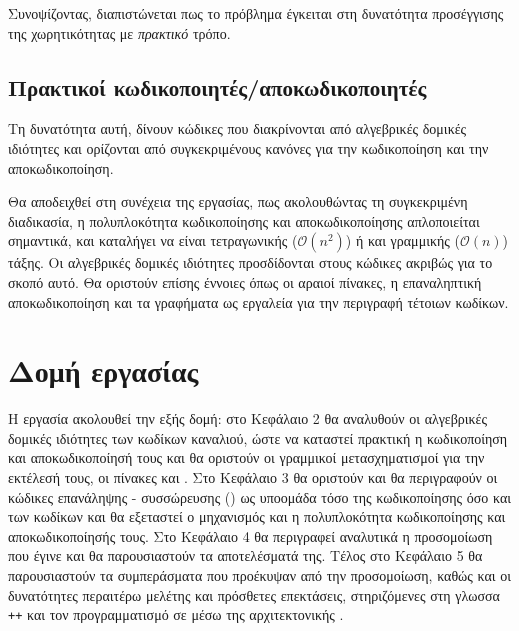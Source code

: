 Συνοψίζοντας, διαπιστώνεται πως το πρόβλημα έγκειται στη δυνατότητα προσέγγισης της χωρητικότητας με \textit{πρακτικό} τρόπο.

\subsection{Πρακτικοί κωδικοποιητές/αποκωδικοποιητές}
Τη δυνατότητα αυτή, δίνουν κώδικες που διακρίνονται από αλγεβρικές δομικές ιδιότητες και ορίζονται από συγκεκριμένους κανόνες για την κωδικοποίηση και την αποκωδικοποίηση.

Θα αποδειχθεί στη συνέχεια της εργασίας, πως ακολουθώντας τη συγκεκριμένη διαδικασία, η πολυπλοκότητα κωδικοποίησης και αποκωδικοποίησης απλοποιείται σημαντικά, και καταλήγει να είναι τετραγωνικής ($\mathcal{O}(n^2)$) ή και γραμμικής ($\mathcal{O}(n)$) τάξης. Οι αλγεβρικές δομικές ιδιότητες προσδίδονται στους κώδικες ακριβώς για το σκοπό αυτό. Θα οριστούν επίσης έννοιες όπως οι αραιοί πίνακες, η επαναληπτική αποκωδικοποίηση και τα γραφήματα  ως εργαλεία για την περιγραφή τέτοιων κωδίκων.

\section{Δομή εργασίας}
Η εργασία ακολουθεί την εξής δομή: στο Κεφάλαιο 2 θα αναλυθούν οι αλγεβρικές δομικές ιδιότητες των κωδίκων καναλιού, ώστε να καταστεί πρακτική η κωδικοποίηση και αποκωδικοποίησή τους και θα οριστούν οι γραμμικοί μετασχηματισμοί για την εκτέλεσή τους, οι πίνακες \textbf{} και \textbf{}. Στο Κεφάλαιο 3 θα οριστούν και θα περιγραφούν οι κώδικες επανάληψης - συσσώρευσης () ως υποομάδα τόσο της κωδικοποίησης  όσο και των  κωδίκων και θα εξεταστεί ο μηχανισμός και η πολυπλοκότητα κωδικοποίησης και αποκωδικοποίησής τους. Στο Κεφάλαιο 4 θα περιγραφεί αναλυτικά η προσομοίωση που έγινε και θα παρουσιαστούν τα αποτελέσματά της. Τέλος στο Κεφάλαιο 5 θα παρουσιαστούν τα συμπεράσματα που προέκυψαν από την προσομοίωση, καθώς και οι δυνατότητες περαιτέρω μελέτης και πρόσθετες επεκτάσεις, στηριζόμενες στη γλωσσα \texttt{++} και τον προγραμματισμό σε  μέσω της αρχιτεκτονικής .
